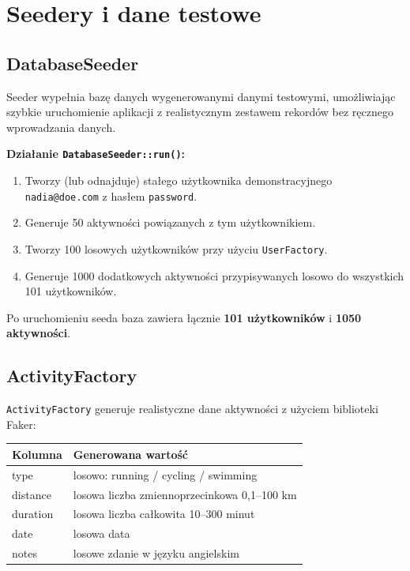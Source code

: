 \documentclass[12pt,a4paper]{report}
\begin{document}
\section{Seedery i dane testowe}

\subsection{DatabaseSeeder}

Seeder wypełnia bazę danych wygenerowanymi danymi testowymi, umożliwiając szybkie uruchomienie aplikacji z realistycznym zestawem rekordów bez ręcznego wprowadzania danych.

\textbf{Działanie \texttt{DatabaseSeeder::run()}:}
\begin{enumerate}[noitemsep]
    \item Tworzy (lub odnajduje) stałego użytkownika demonstracyjnego \texttt{nadia@doe.com} z hasłem \texttt{password}.
    \item Generuje 50 aktywności powiązanych z tym użytkownikiem.
    \item Tworzy 100 losowych użytkowników przy użyciu \texttt{UserFactory}.
    \item Generuje 1000 dodatkowych aktywności przypisywanych losowo do wszystkich 101 użytkowników.
\end{enumerate}

Po uruchomieniu seeda baza zawiera łącznie \textbf{101 użytkowników} i \textbf{1050 aktywności}.

\subsection{ActivityFactory}

\texttt{ActivityFactory} generuje realistyczne dane aktywności z użyciem biblioteki Faker:

\begin{center}
\begin{tabular}{|l|l|}
\hline
\textbf{Kolumna} & \textbf{Generowana wartość} \\
\hline
type             & losowo: running / cycling / swimming \\
distance         & losowa liczba zmiennoprzecinkowa 0{,}1--100 km \\
duration         & losowa liczba całkowita 10--300 minut \\
date             & losowa data \\
notes            & losowe zdanie w języku angielskim \\
\hline
\end{tabular}
\end{center}
\end{document}
